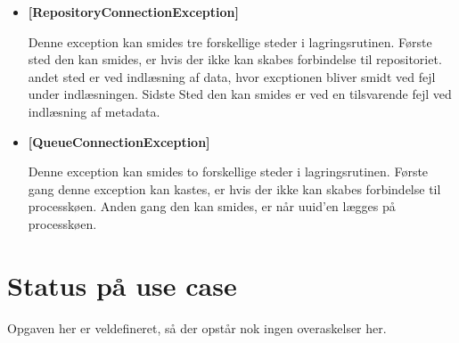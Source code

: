 \documentclass{article}
\begin{document}
\begin{itemize} 

\item \textbf{[RepositoryConnectionException]} 

Denne exception kan smides tre forskellige steder i
lagringsrutinen. Første sted den kan smides, er hvis der ikke kan
skabes forbindelse til repositoriet. andet sted er ved indlæsning af
data, hvor excptionen bliver smidt ved fejl under indlæsningen. Sidste
Sted den kan smides er ved en tilsvarende fejl ved indlæsning af
metadata.

\item \textbf{[QueueConnectionException]}

Denne exception kan smides to forskellige steder i
lagringsrutinen. Første gang denne exception kan kastes, er hvis der
ikke kan skabes forbindelse til processkøen. Anden gang den kan
smides, er når uuid'en lægges på processkøen.

\end{itemize}

\section{Status på use case}

Opgaven her er veldefineret, så der opstår nok ingen overaskelser her.
\end{document}

